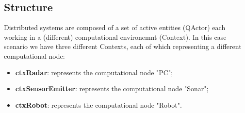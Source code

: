 \subsection{Structure}
Distributed systems are composed of a set of active entities (QActor) each working in a (different) computational environemnt (Context). In this case scenario we have three different Contexts, each of which representing a different computational node:
\begin{itemize}
	\item \textbf{ctxRadar}: represents the computational node "PC";
	\item \textbf{ctxSensorEmitter}: represents the computational node "Sonar";
	\item \textbf{ctxRobot}: represents the computational node "Robot".
\end{itemize}